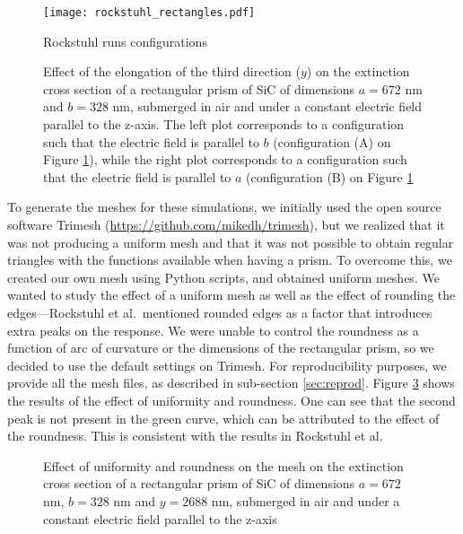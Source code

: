 \begin{figure}
    \centering
    \texttt{[image: rockstuhl\_rectangles.pdf]} 
    \caption{Rockstuhl runs configurations}
    \label{fig:rectangle_sketch}
\end{figure}

\begin{figure}
    \centering
    \caption{Effect of the elongation of the third direction ($y$) on the 
        extinction cross section of a rectangular prism of SiC of dimensions $a=672$ nm 
        and $b=328$ nm, submerged in air and under a constant electric field 
        parallel to the z-axis. The left plot corresponds to a configuration such that the electric 
        field is parallel to $b$ (configuration (A) on Figure \ref{fig:rectangle_sketch}), while the 
        right plot corresponds to a configuration such that the electric field is 
        parallel to $a$ (configuration (B) on Figure \ref{fig:rectangle_sketch}}
    \label{fig:ext_y_14}   
 \end{figure}


To generate the meshes for these simulations, we initially used the open source software Trimesh 
(\url{https://github.com/mikedh/trimesh}), but we realized that it was not producing a 
uniform mesh and that it was not possible to obtain regular triangles with the functions 
available when having a prism. To overcome this, we created our own mesh using Python scripts,
and obtained uniform meshes. We wanted to study the effect of a uniform mesh as well as the effect
of rounding the edges---Rockstuhl et al.\ mentioned rounded edges
as a factor that introduces extra peaks on the response. We were unable to control the 
roundness as a function of arc of curvature or the dimensions of the rectangular prism, so we 
decided to use the default settings on Trimesh. 
For reproducibility purposes, we provide all the mesh files, as described in sub-section \ref{sec:reprod}.
Figure \ref{fig:tri_reg_round_14} shows the 
results of the effect of uniformity and roundness. One can see that the second peak is not
present in the green curve, which can be attributed to the effect of the roundness. This is 
consistent with the results in Rockstuhl et al. 

\begin{figure}
    \centering
    \caption{ Effect of uniformity and roundness on the mesh on the 
    extinction cross section of a rectangular prism of SiC of dimensions $a=672$ nm, 
    $b=328$ nm and $y=2688$ nm, submerged in air and under a constant electric field 
    parallel to the z-axis}
    \label{fig:tri_reg_round_14}
 \end{figure}

